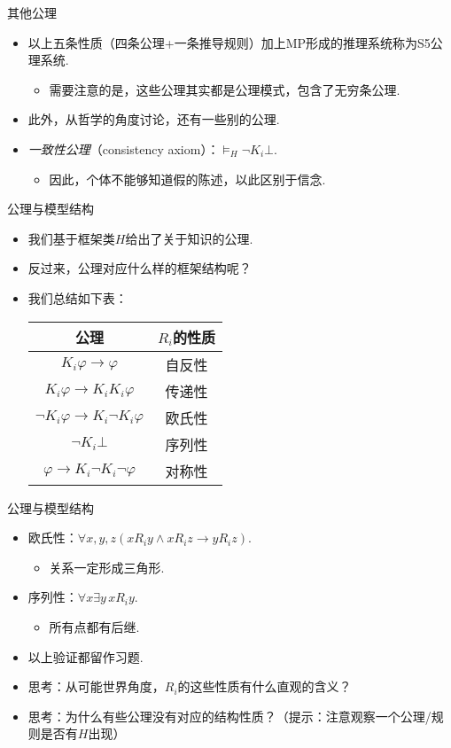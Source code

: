 {其他公理}
\begin{itemize}
    \item 以上五条性质（四条公理+一条推导规则）加上MP形成的推理系统称为S5公理系统.
    \begin{itemize}
        \item 需要注意的是，这些公理其实都是公理模式，包含了无穷条公理.
    \end{itemize}
    \item 此外，从哲学的角度讨论，还有一些别的公理.
    \item \emph{一致性公理}（consistency axiom）：$\vDash_H\neg K_i\bot$.
    \begin{itemize}
        \item 因此，个体不能够知道假的陈述，以此区别于信念.
    \end{itemize}
\end{itemize}

{公理与模型结构}
\begin{itemize}
    \item 我们基于框架类$H$给出了关于知识的公理.
    \item 反过来，公理对应什么样的框架结构呢？
    \item 我们总结如下表：
    \begin{table}[ht]
        \centering
       \begin{tabular}{cc}
\toprule 公理 &  $R_i$的性质 \\
\midrule $K_i \varphi \to \varphi$ & 自反性 \\
$K_i \varphi \to K_i K_i \varphi$ & 传递性 \\
$\neg K_i \varphi \to K_i \neg K_i \varphi$ & 欧氏性 \\
$\neg K_i\bot$  & 序列性\\
$\varphi \to K_i \neg K_i \neg \varphi$ & 对称性 \\
\bottomrule
\end{tabular}
    \end{table}
\end{itemize}


{公理与模型结构}
\begin{itemize}
    \item 欧氏性：$\forall x,y,z(xR_iy\wedge xR_iz\to yR_iz)$.
    \begin{itemize}
        \item 关系一定形成三角形.
    \end{itemize}
    \item 序列性：$\forall x\exists y\, xR_iy$.
    \begin{itemize}
        \item 所有点都有后继.
    \end{itemize}
    \item 以上验证都留作习题. %
    \item 思考：从可能世界角度，$R_i$的这些性质有什么直观的含义？
    \item 思考：为什么有些公理没有对应的结构性质？（提示：注意观察一个公理/规则是否有$H$出现）
\end{itemize}


